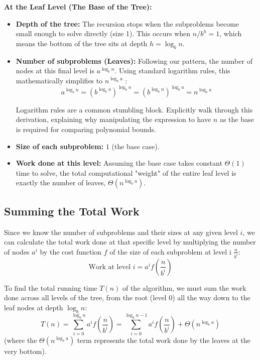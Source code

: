 \documentclass[11pt, a4paper]{article}
\begin{document}
\vspace{0.5cm}
\noindent\textbf{At the Leaf Level (The Base of the Tree):}
\begin{itemize}
    \item \textbf{Depth of the tree:} The recursion stops when the subproblems become small enough to solve directly (size 1). This occurs when $n/b^h= 1$, which means the bottom of the tree sits at depth $h = \log_b n$.
    \item \textbf{Number of subproblems (Leaves):} Following our pattern, the number of nodes at this final level is $a^{\log_b n}$. Using standard logarithm rules, this mathematically simplifies to $n^{\log_b a}$ :
        \[ a^{\log_b n} = (b^{\log_b a})^{\log_b n} = (b^{\log_b n})^{\log_b a} = n^{\log_b a} \]

        \begin{educatortip}
            Logarithm rules are a common stumbling block. Explicitly walk through this derivation, explaining why manipulating the expression to have $n$ as the base is required for comparing polynomial bounds.
        \end{educatortip}
    \item \textbf{Size of each subproblem:} $1$ (the base case).
    \item \textbf{Work done at this level:} Assuming the base case takes constant $\Theta(1)$ time to solve, the total computational "weight" of the entire leaf level is exactly the number of leaves, $\Theta(n^{\log_b a})$. 
\end{itemize}

\subsection*{Summing the Total Work} 
Since we know the number of subproblems and their sizes at any given level $i$, we can calculate the total work done at that specific level by multiplying the number of nodes $a^i$ by the cost function $f$ of the size of each subproblem at level i $\frac{n}{b^i}$:
\begin{equation*}
    \text{Work at level } i = a^i f\left(\frac{n}{b^i}\right)
\end{equation*}

To find the total running time $T(n)$ of the algorithm, we must sum the work done across all levels of the tree, from the root (level 0) all the way down to the leaf nodes at depth $\log_b n$:
\begin{equation*}
    T(n) = \sum_{i=0}^{\log_b n} a^i f\left(\frac{n}{b^i}\right) = \sum_{i=0}^{\log_b n - 1} a^i f\left(\frac{n}{b^i}\right) + \Theta(n^{\log_b a})
\end{equation*}
(where the $\Theta(n^{\log_b a})$ term represents the total work done by the leaves at the very bottom).
\end{document}
